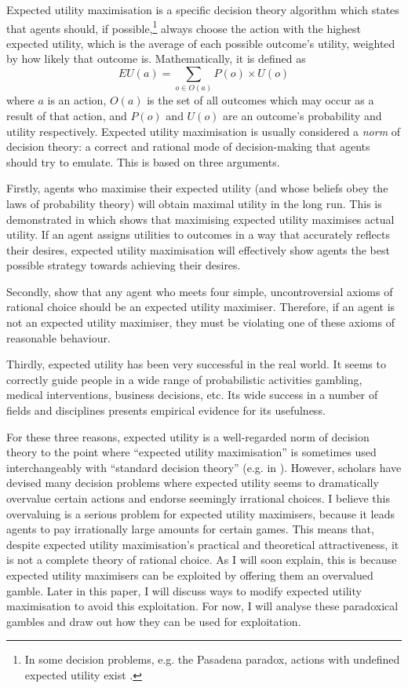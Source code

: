 \documentclass{article}
\begin{document}
Expected utility maximisation is a specific decision theory algorithm which states that agents should, if possible,\footnote{In some decision problems, e.g. the Pasadena paradox, actions with undefined expected utility exist \citep{nover2004vexing}.} always choose the action with the highest expected utility, which is the average of each possible outcome's utility, weighted by how likely that outcome is. Mathematically, it is defined as \[EU(a)=\sum_{o \in O(a)}P(o)\times U(o)\] where \(a\) is an action, \(O(a)\) is the set of all outcomes which may occur as a result of that action, and \(P(o)\) and \(U(o)\) are an outcome's probability and utility respectively. Expected utility maximisation is usually considered a \textit{norm} of decision theory: a correct and rational mode of decision-making that agents should try to emulate. This is based on three arguments.

Firstly, agents who maximise their expected utility (and whose beliefs obey the laws of probability theory) will obtain maximal utility in the long run. This is demonstrated in \citet{von1944games} which shows that maximising expected utility maximises actual utility. If an agent assigns utilities to outcomes in a way that accurately reflects their desires, expected utility maximisation will effectively show agents the best possible strategy towards achieving their desires. 

Secondly, \citet{von1944games} show that any agent who meets four simple, uncontroversial axioms of rational choice should be an expected utility maximiser. Therefore, if an agent is not an expected utility maximiser, they must be violating one of these axioms of reasonable behaviour. %

Thirdly, expected utility has been very successful in the real world. It seems to correctly guide people in a wide range of probabilistic activities \textemdash{} gambling, medical interventions, business decisions, etc. Its wide success in a number of fields and disciplines presents empirical evidence for its usefulness.

For these three reasons, expected utility is a well-regarded norm of decision theory \textemdash{} to the point where ``expected utility maximisation'' is sometimes used interchangeably with ``standard decision theory'' (e.g. in \citet[pg. 38]{colyvan2008relative}). However, scholars have devised many decision problems where expected utility seems to dramatically overvalue certain actions and endorse seemingly irrational choices. I believe this overvaluing is a serious problem for expected utility maximisers, because it leads agents to pay irrationally large amounts for certain games. This means that, despite expected utility maximisation's practical and theoretical attractiveness, it is not a complete theory of rational choice. As I will soon explain, this is because expected utility maximisers can be exploited by offering them an overvalued gamble. Later in this paper, I will discuss ways to modify expected utility maximisation to avoid this exploitation. For now, I will analyse these paradoxical gambles and draw out how they can be used for exploitation.
\end{document}
